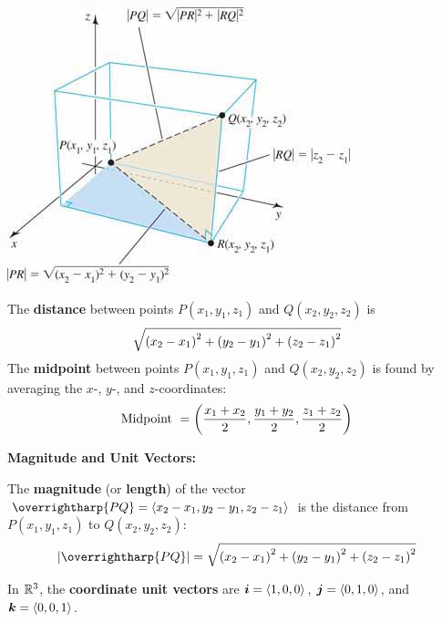 \documentclass[mathNotesPreamble]{subfiles}
\begin{document}
    \begin{center}
      \includegraphics[width=0.5\linewidth]{images/briggs_13_02/fig13_32}
    \end{center}
    \begin{thmBox*}

      The \textbf{distance} between points $P(x_1,y_1,z_1)$ and $Q(x_2,y_2,z_2)$ is
        \[\sqrt{{\left(x_2-x_1\right)}^2+{\left(y_2-y_1\right)}^2+{\left(z_2-z_1\right)}^2}\]
      The \textbf{midpoint} between points $P(x_1,y_1,z_1)$ and $Q(x_2,y_2,z_2)$ is found by averaging the $x$-, $y$-, and $z$-coordinates:
        \[\textnormal{Midpoint }={\left(\frac{x_1+x_2}{2},\frac{y_1+y_2}{2},\frac{z_1+z_2}{2}\right)}\]
    \end{thmBox*}
    \pagebreak

    \textbf{Magnitude and Unit Vectors:}
  \begin{defn*}
    The \textbf{magnitude} (or \textbf{length}) of the vector $\overrightharp{PQ}=\bracket{x_2-x_1,y_2-y_1,z_2-z_1}$ is the distance from $P(x_1,y_1,z_1)$ to $Q(x_2,y_2,z_2)$:
      \[\abs{\overrightharp{PQ}}=\sqrt{\parens{x_2-x_1}^2+\parens{y_2-y_1}^2+\parens{z_2-z_1}^2}\]
  \end{defn*}
  \noindent
  In $\mathbb{R}^3$, the \textbf{coordinate unit vectors} are ${\bm{i}}={\left\langle 1,0,0 \right\rangle}$, ${\bm{j}}={\left\langle 0,1,0 \right\rangle}$, and ${\bm{k}}={\left\langle 0,0,1 \right\rangle}$.
\end{document}
